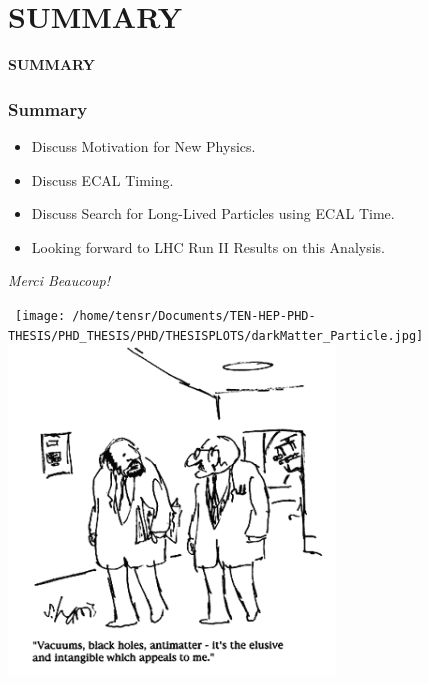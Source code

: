 \documentclass{beamer}
\begin{document}
\section{SUMMARY}
{
\begin{frame}
  \begin{center}
    \textcolor{UMN@Maroon}{\Huge{\textbf{SUMMARY}}}
  \end{center}
\end{frame}
}

\begin{frame}
\frametitle{Summary}
\begin{itemize}
\item Discuss Motivation for New Physics.
\item Discuss ECAL Timing.
\item Discuss Search for Long-Lived Particles using ECAL Time.
\item Looking forward to LHC Run II Results on this Analysis.
\end{itemize}
\end{frame}





{
\begin{frame}
 \begin{center}
   \textcolor{UMN@Maroon}{\Huge{\textsl{Merci Beaucoup!}} }
 \end{center}
 
 \begin{minipage}[b]{0.65\textwidth}
\mbox{
\texttt{[image: /home/tensr/Documents/TEN-HEP-PHD-THESIS/PHD\_THESIS/PHD/THESISPLOTS/darkMatter\_Particle.jpg]} \quad \quad
\includegraphics[height=0.65\textwidth,width=0.65\textwidth]{THESISPLOTS/New-Physics-PLOTS/ElusiveParticles.png}
}
 \end{minipage}
\end{frame}
}
\end{document}
